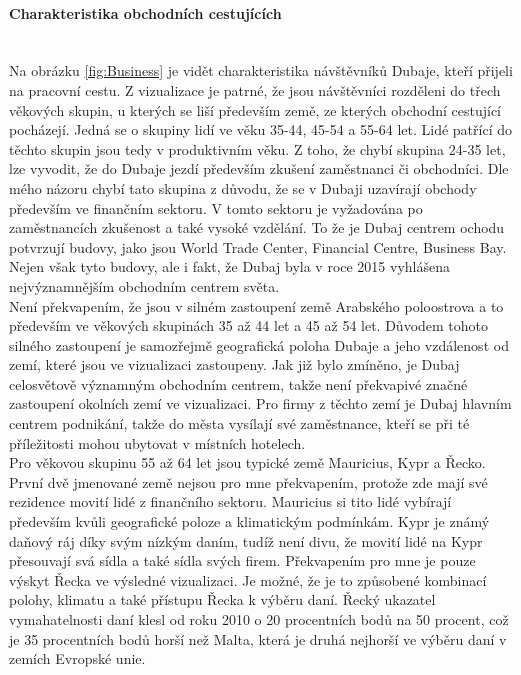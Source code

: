 \documentclass[czech,BP]{thesiskiv}
\begin{document}
\paragraph{Charakteristika obchodních cestujících}
\mbox{}\\ \noindent
Na obrázku \ref{fig:Business} je vidět charakteristika návštěvníků Dubaje, kteří přijeli na pracovní cestu. Z vizualizace je patrné, že jsou návštěvníci rozděleni do třech věkových skupin, u kterých se liší především země, ze kterých obchodní cestující pocházejí. Jedná se o skupiny lidí ve věku 35-44, 45-54 a 55-64 let. Lidé patřící do těchto skupin jsou tedy v produktivním věku. Z toho, že chybí skupina 24-35 let, lze vyvodit, že do Dubaje jezdí především zkušení zaměstnanci či obchodníci. Dle mého názoru chybí tato skupina z důvodu, že se v Dubaji uzavírají obchody především ve finančním sektoru. V tomto sektoru je vyžadována po zaměstnancích zkušenost a také vysoké vzdělání. To že je Dubaj centrem ochodu potvrzují budovy, jako jsou World Trade Center, Financial Centre, Business Bay. Nejen však tyto budovy, ale i fakt, že Dubaj byla v roce 2015 vyhlášena nejvýznamnějším obchodním centrem světa.\cite{BusinessDubai} 
\\
Není překvapením, že jsou v silném zastoupení země Arabského poloostrova a to především ve věkových skupinách 35 až 44 let a 45 až 54 let. Důvodem tohoto silného zastoupení je samozřejmě geografická poloha Dubaje a jeho vzdálenost od zemí, které jsou ve vizualizaci zastoupeny. Jak již bylo zmíněno, je Dubaj celosvětově významným obchodním centrem, takže není překvapivé značné zastoupení okolních zemí ve vizualizaci. Pro firmy z těchto zemí je Dubaj hlavním centrem podnikání, takže do města vysílají své zaměstnance, kteří se při té příležitosti mohou ubytovat v místních hotelech.
\\
Pro věkovou skupinu 55 až 64 let jsou typické země Mauricius, Kypr a Řecko. První dvě jmenované země nejsou pro mne překvapením, protože zde mají své rezidence movití lidé z finančního sektoru. Mauricius si tito lidé vybírají především kvůli geografické poloze a klimatickým podmínkám. Kypr je známý daňový ráj díky svým nízkým daním, tudíž není divu, že movití lidé na Kypr přesouvají svá sídla a také sídla svých firem. Překvapením pro mne je pouze výskyt Řecka ve výsledné vizualizaci. Je možné, že je to způsobené kombinací polohy, klimatu a také přístupu Řecka k výběru daní. Řecký ukazatel vymahatelnosti daní klesl od roku 2010 o 20 procentních bodů na 50 procent, což je 35 procentních bodů horší než Malta, která je druhá nejhorší ve výběru daní v zemích Evropské unie.\cite{GreeceTaxes} 
\end{document}
